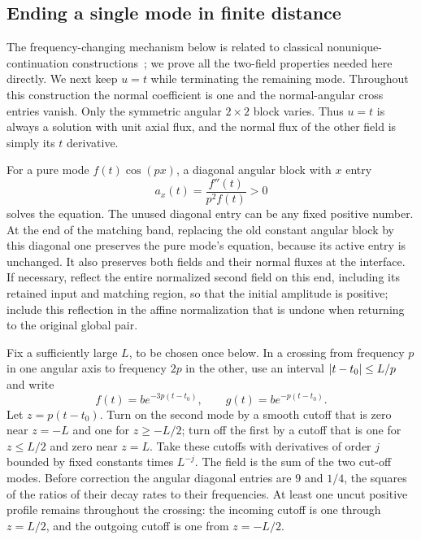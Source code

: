 \subsection{Ending a single mode in finite distance}

The frequency-changing mechanism below is related to classical
nonunique-continuation constructions~\cite{Miller}; we prove all the
two-field properties needed here directly.  We next keep $u=t$ while
terminating the remaining mode.  Throughout
this construction the normal coefficient is one and the normal-angular
cross entries vanish.  Only the symmetric angular $2\times2$ block
varies.  Thus $u=t$ is always a solution with unit axial flux, and the
normal flux of the other field is simply its $t$ derivative.

For a pure mode $f(t)\cos(px)$, a diagonal angular block with $x$ entry
\begin{equation}\label{bl:pure-angular-entry}
 a_x(t)=\frac{f''(t)}{p^2f(t)}>0
\end{equation}
solves the equation.  The unused diagonal entry can be any fixed
positive number.  At the end of the matching band, replacing the old
constant angular block by this diagonal one preserves the pure mode's
equation, because its active entry is unchanged.  It also preserves
both fields and their normal fluxes at the interface.  If necessary,
reflect the entire normalized second field on this end, including its
retained input and matching region, so that the initial amplitude is
positive; include this reflection in the affine normalization that is
undone when returning to the original global pair.

Fix a sufficiently large $L$, to be chosen once below.  In a crossing
from frequency $p$ in one angular axis to frequency $2p$ in the other,
use an interval
$\left\lvert t-t_0\right\rvert\le L/p$ and write
\begin{equation}\label{bl:crossing-profiles}
 f(t)=b e^{-3p(t-t_0)},\qquad
 g(t)=b e^{-p(t-t_0)}.
\end{equation}
Let $z=p(t-t_0)$.  Turn on the second mode by a smooth cutoff that is
zero near $z=-L$ and one for $z\ge-L/2$; turn off the first by a cutoff
that is one for $z\le L/2$ and zero near $z=L$.  Take these cutoffs with
derivatives of order $j$ bounded by fixed constants times $L^{-j}$.
The field is the sum of the two cut-off modes.  Before correction the
angular diagonal entries are $9$ and $1/4$, the squares of the ratios
of their decay rates to their frequencies.
At least one uncut positive profile remains throughout the crossing:
the incoming cutoff is one through $z=L/2$, and the outgoing cutoff
is one from $z=-L/2$.

